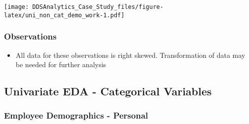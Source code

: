 \documentclass[]{article}
\providecommand{\tightlist}{%
  \setlength{\itemsep}{0pt}\setlength{\parskip}{0pt}}
\begin{document}
\texttt{[image: DDSAnalytics\_Case\_Study\_files/figure-latex/uni\_non\_cat\_demo\_work-1.pdf]}

\subsubsection{Observations}\label{observations-2}

\begin{itemize}
\tightlist
\item
  All data for these observations is right skewed. Transformation of
  data may be needed for further analysis
\end{itemize}

\subsection{Univariate EDA - Categorical
Variables}\label{univariate-eda---categorical-variables}

\subsubsection{Employee Demographics -
Personal}\label{employee-demographics---personal}
\end{document}
